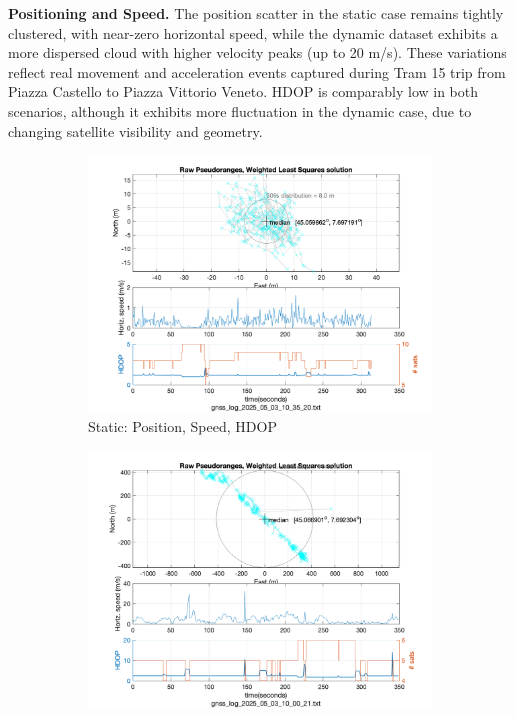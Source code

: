         \vspace{0.5em}
        \textbf{Positioning and Speed.} 
        The position scatter in the static case remains tightly clustered, with near-zero horizontal speed, while the dynamic dataset exhibits a more dispersed cloud with higher velocity peaks (up to 20 m/s). 
        These variations reflect real movement and acceleration events captured during Tram 15 trip from Piazza Castello to Piazza Vittorio Veneto. 
        HDOP is comparably low in both scenarios, although it exhibits more fluctuation in the dynamic case, due to changing satellite visibility and geometry.
    
        \begin{figure}[h!]
            \centering
            \begin{subfigure}{0.23\textwidth}
                \includegraphics[width=\textwidth]{images/tests/Monte_Cappuccini/png/Samsung_A51_Monte_Cappuccini_fig4.png}
                \caption{Static: Position, Speed, HDOP}
            \end{subfigure}
            \hfill
            \begin{subfigure}{0.23\textwidth}
                \includegraphics[width=\textwidth]{images/tests/Tram_15_trip_Castello_to_Pescatore/png/Samsung_A51_Tram_15_trip_Castello_to_Pescatore_fig4.png}

\end{subfigure}
\end{figure}
